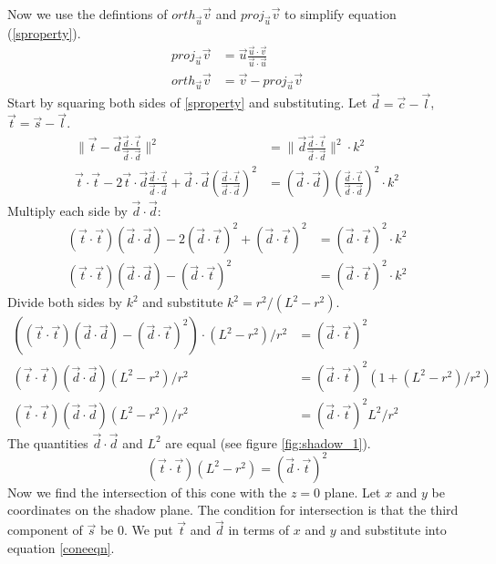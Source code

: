 \documentclass[10pt]{article}
\begin{document}
\begin{appendices}
Now we use the defintions of $orth_{\vec{u}} \vec{v}$ and $proj_{\vec{u}} \vec{v}$ to simplify equation (\ref{sproperty}).
\begin{align*}
proj_{\vec{u}} \vec{v} &= \vec{u} \frac{\vec{u}\cdot\vec{v}}{\vec{u}\cdot\vec{u}}\\
orth_{\vec{u}} \vec{v} &= \vec{v} - proj_{\vec{u}} \vec{v}
\end{align*}
Start by squaring both sides of \ref{sproperty} and substituting. Let $\vec{d} = \vec{c}-\vec{l}$, $\vec{t} = \vec{s}-\vec{l}$.
\begin{align*}
\|\vec{t} - \vec{d} \frac{\vec{d}\cdot\vec{t}}{\vec{d}\cdot\vec{d}}\|^2 &= \|\vec{d} \frac{\vec{d}\cdot\vec{t}}{\vec{d}\cdot\vec{d}}\|^2 \cdot k^2\\
\vec{t}\cdot\vec{t}-2\vec{t}\cdot\vec{d} \frac{\vec{d}\cdot\vec{t}}{\vec{d}\cdot\vec{d}}+\vec{d}\cdot\vec{d}(\frac{\vec{d}\cdot\vec{t}}{\vec{d}\cdot\vec{d}})^2 &= (\vec{d}\cdot\vec{d}) (\frac{\vec{d}\cdot\vec{t}}{\vec{d}\cdot\vec{d}})^2 \cdot k^2
\end{align*}
Multiply each side by $\vec{d}\cdot\vec{d}$:
\begin{align*}
(\vec{t}\cdot\vec{t})(\vec{d}\cdot\vec{d})-2(\vec{d}\cdot\vec{t})^2+(\vec{d}\cdot\vec{t})^2  &= (\vec{d}\cdot\vec{t})^2 \cdot k^2\\
(\vec{t}\cdot\vec{t})(\vec{d}\cdot\vec{d})-(\vec{d}\cdot\vec{t})^2 & = (\vec{d}\cdot\vec{t})^2 \cdot k^2
\end{align*}
Divide both sides by $k^2$ and substitute $k^2 = r^2 / ( L^2-r^2)$.
\begin{align*}
((\vec{t}\cdot\vec{t})(\vec{d}\cdot\vec{d})-(\vec{d}\cdot\vec{t})^2)\cdot ( L^2-r^2)/r^2 &=  (\vec{d}\cdot\vec{t})^2\\
(\vec{t}\cdot\vec{t})(\vec{d}\cdot\vec{d})( L^2-r^2)/r^2 &=  (\vec{d}\cdot\vec{t})^2(1 + ( L^2-r^2)/r^2)\\
(\vec{t}\cdot\vec{t})(\vec{d}\cdot\vec{d})( L^2-r^2)/r^2 &=  (\vec{d}\cdot\vec{t})^2 L^2/r^2
\end{align*}
The quantities $\vec{d}\cdot\vec{d}$ and $L^2$ are equal (see figure \ref{fig:shadow_1}).
\begin{equation}\label{coneeqn}
(\vec{t}\cdot\vec{t})( L^2-r^2) =  (\vec{d}\cdot\vec{t})^2
\end{equation}
Now we find the intersection of this cone with the $z=0$ plane. Let $x$ and $y$ be coordinates on the shadow plane. The condition for intersection is that the third component of $\vec{s}$ be $0$. We put $\vec{t}$ and $\vec{d}$ in terms of $x$ and $y$ and substitute into equation \ref{coneeqn}.

\end{appendices}
\end{document}
